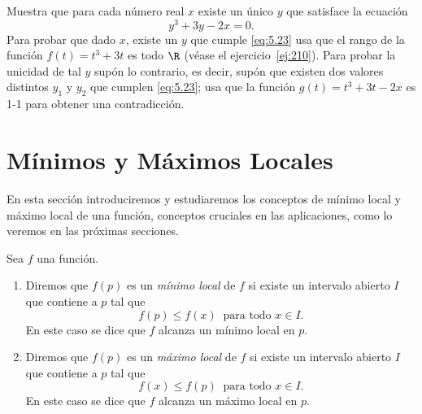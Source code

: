 \documentclass[12pt,a4paper]{book}
\begin{document}
    \begin{ejercicio}\label{ej:266}
        Muestra que para cada número real $x$ existe un único $y$ que
        satisface la ecuación
        \begin{equation}\label{eq:5.23}
            y^{3}+3y-2x=0.
        \end{equation}
        \sugerencia Para probar que dado $x$, existe un $y$ que cumple \eqref{eq:5.23} usa
        que el rango de la función $f(t)=t^{3}+3t$ es todo $\R$ (véase el ejercicio~\ref{ej:210}).
        Para probar la unicidad de tal $y$ supón lo contrario, es decir, supón que
        existen dos valores distintos $y_{1}$ y $y_{2}$ que cumplen \eqref{eq:5.23}; usa que la función
        $g(t)=t^{3}+3t-2x$ es 1-1 para obtener una contradicción.
    \end{ejercicio}

    \section{Mínimos y Máximos Locales}

    En esta sección introduciremos y estudiaremos los conceptos de mínimo
    local y máximo local de una función, conceptos cruciales en las aplicaciones,
    como lo veremos en las próximas secciones.

    \begin{definicion}\label{def:50}
        Sea $f$ una función.
        \begin{enumerate}
            \item Diremos que $f(p)$ es un \textit{mínimo local} de $f$ si existe un intervalo abierto $I$
            que contiene a $p$ tal que
            \begin{equation*}
                f(p)\leq f(x)\ \text{ para todo }x\in I.
            \end{equation*}
            En este caso se dice que $f$ alcanza un mínimo local en $p$.
            \item Diremos que $f(p)$ es un \textit{máximo local} de $f$ si existe un intervalo abierto $I$
            que contiene a $p$ tal que
            \begin{equation*}
                f(x)\leq f(p)\ \text{ para todo }x\in I.
            \end{equation*}
            En este caso se dice que $f$ alcanza un máximo local en $p$.
        \end{enumerate}
    \end{definicion}
\end{document}
